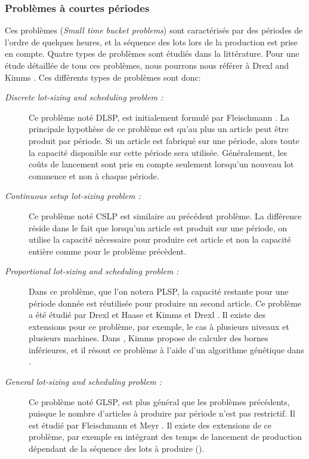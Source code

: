 \documentclass[12pt,a4paper]{article}
\begin{document}
	\subsubsection{Problèmes à courtes périodes}
	Ces problèmes (\emph{Small time bucket problems}) sont caractérisés par des périodes de l'ordre de quelques heures, et la séquence des lots lors de la production est prise en compte. Quatre types de problèmes sont étudiés dans la littérature. Pour une étude détaillée de tous ces problèmes, nous pourrons nous référer à Drexl and Kimms \cite{drexl_kimms}. Ces différents types de problèmes sont donc:
	\begin{description}
		\item[\textsl{Discrete lot-sizing and scheduling problem :}]
		Ce problème noté DLSP, est initialement formulé par Fleischmann \cite{fleischmann}. La principale hypothèse de ce problème est qu'au plus un article peut être produit par
période. Si un article est fabriqué sur une période, alors toute la capacité disponible sur cette période sera utilisée. Généralement, les coûts de lancement sont pris en compte seulement lorsqu'un nouveau lot commence et non à chaque période.
		\item[\textsl{Continuous setup lot-sizing problem :}]
		Ce problème noté CSLP est similaire au précédent problème. La différence réside dans le fait que lorsqu'un article est produit sur une période, on utilise la capacité nécessaire pour produire cet article et non la capacité entière comme pour le problème précèdent.
		\item[\textsl{Proportional lot-sizing and scheduling problem : }] 
		Dans ce problème, que l'on notera PLSP, la capacité restante pour une période donnée est réutilisée pour produire un second article. Ce problème a été étudié par Drexl et Haase \cite{drexl_haase} et Kimms et Drexl \cite{drexl_kimms}. Il existe des extensions pour ce problème, par exemple, le cas à plusieurs niveaux et plusieurs machines. Dans \cite{kimms}, Kimms propose de calculer des bornes inférieures, et il résout ce problème à l'aide d'un algorithme génétique dans \cite{kimms2}.
		\item[\textsl{General lot-sizing and scheduling problem : }] 
		Ce problème noté GLSP, est plus général que les problèmes précédents, puisque le nombre d'articles à produire par période n'est pas restrictif. Il est étudié par Fleischmann et Meyr \cite{fleischmann_meyr}. Il existe des extensions de ce problème, par exemple en intégrant des temps de lancement de production dépendant de la séquence des lots à produire (\cite{meyr}).
	\end{description}
	
\end{document}

